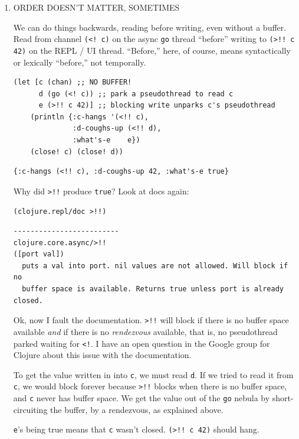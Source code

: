 \documentclass[10pt,oneside,x11names]{article}
\begin{document}
\begin{enumerate}
\item ORDER DOESN'T MATTER, SOMETIMES
\label{sec:org012156f}

We can do things backwards, reading before writing, even without a
buffer. Read from channel \texttt{(<! c)} on the async \texttt{go} thread ``before''
writing to \texttt{(>!! c 42)} on the REPL / UI thread. ``Before,'' here, of
course, means syntactically or lexically ``before,'' not temporally.

\begin{verbatim}
(let [c (chan) ;; NO BUFFER!
      d (go (<! c)) ;; park a pseudothread to read c
      e (>!! c 42)] ;; blocking write unparks c's pseudothread
    (println {:c-hangs '(<!! c),
              :d-coughs-up (<!! d),
              :what's-e    e})
    (close! c) (close! d))
\end{verbatim}

\begin{verbatim}
{:c-hangs (<!! c), :d-coughs-up 42, :what's-e true}
\end{verbatim}


Why did \texttt{>!!} produce \texttt{true}? Look at docs again:

\begin{verbatim}
(clojure.repl/doc >!!)
\end{verbatim}

\begin{verbatim}
-------------------------
clojure.core.async/>!!
([port val])
  puts a val into port. nil values are not allowed. Will block if no
  buffer space is available. Returns true unless port is already closed.
\end{verbatim}


Ok, now I fault the documentation. \texttt{>!!} will block if there is no
buffer space available \emph{and} if there is no \emph{rendezvous} available, that
is, no pseudothread parked waiting for \texttt{<!}. I have an open question in
the Google group for Clojure about this issue with the documentation.

To get the value written in into \texttt{c}, we must read \texttt{d}. If we tried to
read it from \texttt{c}, we would block forever because \texttt{>!!} blocks when there
is no buffer space, and \texttt{c} never has buffer space. We get the value out
of the \texttt{go} nebula by short-circuiting the buffer, by a rendezvous, as
explained above.

\texttt{e}'s being true means that \texttt{c} wasn't closed. \texttt{(>!! c 42)} should hang.


\end{enumerate}
\end{document}
